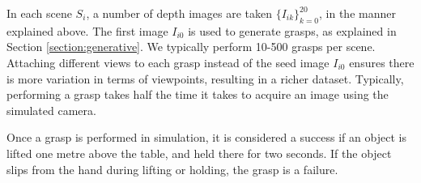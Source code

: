 
In each scene $S_i$, a number of depth images are taken $\{I_{ik}\}_{k=0}^{20}$, in the manner explained above. The first image $I_{i0}$ is used to generate grasps, as explained in Section \ref{section:generative}. We typically perform 10-500 grasps per scene. Attaching different views to each grasp instead of the seed image $I_{i0}$ ensures there is more variation in terms of viewpoints, resulting in a richer dataset. Typically, performing a grasp takes half the time it takes to acquire an image using the simulated camera.

Once a grasp is performed in simulation, it is considered a success if an object is lifted one metre above the table, and held there for two seconds. If the object slips from the hand during lifting or holding, the grasp is a failure. 

